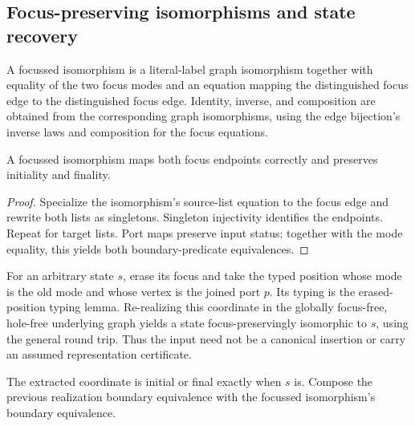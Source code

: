 \subsection{Focus-preserving isomorphisms and state recovery}
\begin{definition}\label{term:focussed-isomorphism}
A focussed isomorphism is a literal-label graph isomorphism together with
equality of the two focus modes and an equation mapping the distinguished
focus edge to the distinguished focus edge. Identity, inverse, and composition
are obtained from the corresponding graph isomorphisms, using the edge
bijection's inverse laws and composition for the focus equations.
\end{definition}

\begin{lemma}
A focussed isomorphism maps both focus endpoints correctly and preserves
initiality and finality.
\end{lemma}
\begin{proof}
Specialize the isomorphism's source-list equation to the focus edge and rewrite
both lists as singletons. Singleton injectivity identifies the endpoints.
Repeat for target lists. Port maps preserve input status; together with the
mode equality, this yields both boundary-predicate equivalences.
\end{proof}

\begin{definition}\label{term:state-coordinate}
For an arbitrary state $s$, erase its focus and take the typed position whose
mode is the old mode and whose vertex is the joined port $p$. Its typing is
the erased-position typing lemma. Re-realizing this coordinate in the globally
focus-free, hole-free underlying graph yields a state focus-preservingly
isomorphic to $s$, using the general round trip. Thus the input need not be a
canonical insertion or carry an assumed representation certificate.
\end{definition}
The extracted coordinate is initial or final exactly when $s$ is. Compose the
previous realization boundary equivalence with the focussed isomorphism's
boundary equivalence.



